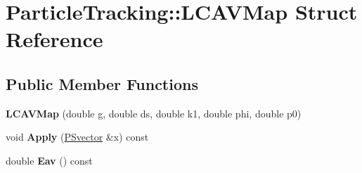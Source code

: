 \hypertarget{structParticleTracking_1_1LCAVMap}{}\section{Particle\+Tracking\+:\+:L\+C\+A\+V\+Map Struct Reference}
\label{structParticleTracking_1_1LCAVMap}
\subsection*{Public Member Functions}
\begin{DoxyCompactItemize}
\item 
\mbox{\label{structParticleTracking_1_1LCAVMap_ac9a968f13dff517c51adae86db4be375}} 
{\bfseries L\+C\+A\+V\+Map} (double g, double ds, double k1, double phi, double p0)
\item 
\mbox{\label{structParticleTracking_1_1LCAVMap_a1031008d25fcfe8893adb5b3e2f1d9c0}} 
void {\bfseries Apply} (\hyperlink{classPSvector}{P\+Svector} \&x) const
\item 
\mbox{\label{structParticleTracking_1_1LCAVMap_a44bcf49adfd2c6678af2386f8b182f66}} 
double {\bfseries Eav} () const
\end{DoxyCompactItemize}
